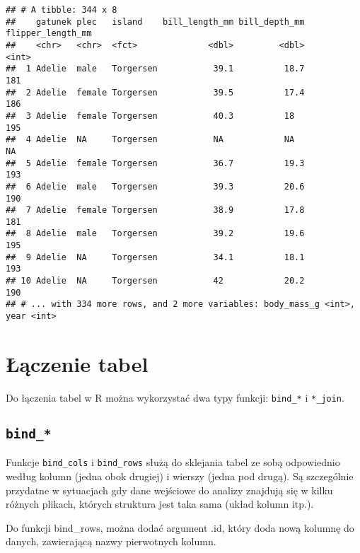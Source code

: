\documentclass[
]{book}
\begin{document}
\begin{verbatim}
## # A tibble: 344 x 8
##    gatunek plec   island    bill_length_mm bill_depth_mm flipper_length_mm
##    <chr>   <chr>  <fct>              <dbl>         <dbl>             <int>
##  1 Adelie  male   Torgersen           39.1          18.7               181
##  2 Adelie  female Torgersen           39.5          17.4               186
##  3 Adelie  female Torgersen           40.3          18                 195
##  4 Adelie  NA     Torgersen           NA            NA                  NA
##  5 Adelie  female Torgersen           36.7          19.3               193
##  6 Adelie  male   Torgersen           39.3          20.6               190
##  7 Adelie  female Torgersen           38.9          17.8               181
##  8 Adelie  male   Torgersen           39.2          19.6               195
##  9 Adelie  NA     Torgersen           34.1          18.1               193
## 10 Adelie  NA     Torgersen           42            20.2               190
## # ... with 334 more rows, and 2 more variables: body_mass_g <int>, year <int>
\end{verbatim}

\hypertarget{ux142ux105czenie-tabel}{%
\section{Łączenie tabel}\label{ux142ux105czenie-tabel}}

Do łączenia tabel w R można wykorzystać dwa typy funkcji: \texttt{bind\_*} i \texttt{*\_join}.

\hypertarget{bind_}{%
\subsection{\texorpdfstring{\texttt{bind\_*}}{bind\_*}}\label{bind_}}

Funkcje \texttt{bind\_cols} i \texttt{bind\_rows} służą do sklejania tabel ze sobą odpowiednio według kolumn (jedna obok drugiej) i wierszy (jedna pod drugą). Są szczególnie przydatne w sytuacjach gdy dane wejściowe do analizy znajdują się w kilku różnych plikach, których struktura jest taka sama (układ kolumn itp.).

Do funkcji bind\_rows, można dodać argument .id, który doda nową kolumnę do danych, zawierającą nazwy pierwotnych kolumn.
\end{document}
